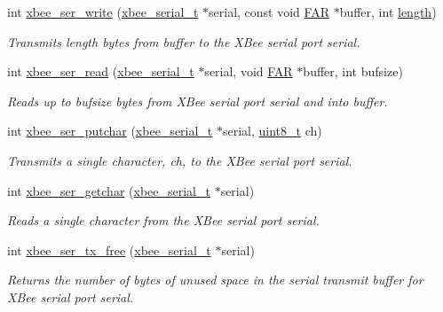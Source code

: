 \begin{DoxyCompactItemize}
int \hyperlink{group__hal__win32_ga2ca4e60c9d642084afa52dff9e1f6be4}{xbee\-\_\-ser\-\_\-write} (\hyperlink{structxbee__serial__t}{xbee\-\_\-serial\-\_\-t} $\ast$serial, const void \hyperlink{group__hal_gaef060b3456fdcc093a7210a762d5f2ed}{F\-A\-R} $\ast$buffer, int \hyperlink{group__zdo_gab2b3adeb2a67e656ff030b56727fd0ac}{length})
\begin{DoxyCompactList}\small\item\em Transmits {\itshape length} bytes from {\itshape buffer} to the X\-Bee serial port {\itshape serial}. \end{DoxyCompactList}\item 
int \hyperlink{group__hal__win32_ga8263312373c03a79a718142e051b3342}{xbee\-\_\-ser\-\_\-read} (\hyperlink{structxbee__serial__t}{xbee\-\_\-serial\-\_\-t} $\ast$serial, void \hyperlink{group__hal_gaef060b3456fdcc093a7210a762d5f2ed}{F\-A\-R} $\ast$buffer, int bufsize)
\begin{DoxyCompactList}\small\item\em Reads up to {\itshape bufsize} bytes from X\-Bee serial port {\itshape serial} and into {\itshape buffer}. \end{DoxyCompactList}\item 
int \hyperlink{group__hal__win32_ga86fea2345efb8bf9424228f0979b1849}{xbee\-\_\-ser\-\_\-putchar} (\hyperlink{structxbee__serial__t}{xbee\-\_\-serial\-\_\-t} $\ast$serial, \hyperlink{group__hal_gae1affc9ca37cfb624959c866a73f83c2}{uint8\-\_\-t} ch)
\begin{DoxyCompactList}\small\item\em Transmits a single character, {\itshape ch}, to the X\-Bee serial port {\itshape serial}. \end{DoxyCompactList}\item 
int \hyperlink{group__hal__win32_gaeeb38154313a44f86146cdcfe08e7d08}{xbee\-\_\-ser\-\_\-getchar} (\hyperlink{structxbee__serial__t}{xbee\-\_\-serial\-\_\-t} $\ast$serial)
\begin{DoxyCompactList}\small\item\em Reads a single character from the X\-Bee serial port {\itshape serial}. \end{DoxyCompactList}\item 
int \hyperlink{group__hal__win32_ga3ad8f378b572d6fec982f1086bd3b94f}{xbee\-\_\-ser\-\_\-tx\-\_\-free} (\hyperlink{structxbee__serial__t}{xbee\-\_\-serial\-\_\-t} $\ast$serial)
\begin{DoxyCompactList}\small\item\em Returns the number of bytes of unused space in the serial transmit buffer for X\-Bee serial port {\itshape serial}. \end{DoxyCompactList}\item 

\end{DoxyCompactItemize}
